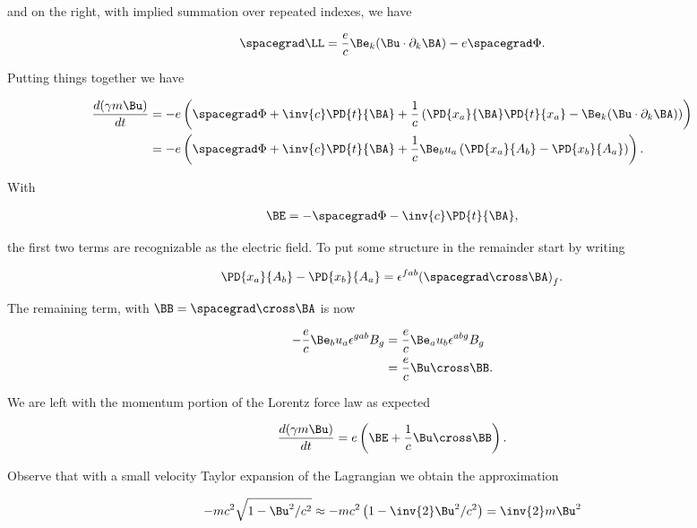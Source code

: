 and on the right, with implied summation over repeated indexes, we have

\begin{align}\label{eqn:hamiltonian:em2r}
\spacegrad \LL = \frac{e}{c} \Be_k (\Bu \cdot \partial_k \BA) - e \spacegrad \Phi.
\end{align}

Putting things together we have

\begin{align*}
\frac{d(\gamma m \Bu)}{dt} 
&= 
-e \left(
\spacegrad \Phi + \inv{c} \PD{t}{\BA}
+ \frac{1}{c} 
\left(
\PD{x_a}{\BA} \PD{t}{x_a} - \Be_k (\Bu \cdot \partial_k \BA) 
\right)
\right) \\
&= 
-e \left(
\spacegrad \Phi + \inv{c} \PD{t}{\BA}
+ \frac{1}{c} \Be_b u_a
\left(
\PD{x_a}{A_b} 
-
\PD{x_b}{A_a}
\right)
\right).
\end{align*}

With 

\begin{align}\label{eqn:hamiltonian:em3}
\BE = -\spacegrad \Phi - \inv{c} \PD{t}{\BA},
\end{align}

the first two terms are recognizable as the electric field.  To put some structure in the remainder start by writing

\begin{align}\label{eqn:hamiltonian:em4}
\PD{x_a}{A_b} - \PD{x_b}{A_a} = \epsilon^{fab} {(\spacegrad \cross \BA)}_f.
\end{align}

The remaining term, with $\BB = \spacegrad \cross \BA$ is now 
 
\begin{align*}
- \frac{e}{c} \Be_b u_a \epsilon^{gab} B_g
&=
\frac{e}{c} 
\Be_a u_b \epsilon^{abg} B_g \\
&= 
\frac{e}{c} \Bu \cross \BB.
\end{align*}

We are left with the momentum portion of the Lorentz force law as expected

\begin{align}\label{eqn:hamiltonian:em5}
\frac{d(\gamma m \Bu)}{dt} = e \left( \BE + \frac{1}{c} \Bu \cross \BB \right).
\end{align}

Observe that with a small velocity Taylor expansion of the Lagrangian we obtain the approximation

\begin{align}\label{eqn:hamiltonian:em6}
-m c^2 \sqrt{ 1 -\Bu^2/c^2} \approx - m c^2 \left( 1 - \inv{2} \Bu^2/c^2 \right) = \inv{2} m \Bu^2
\end{align}

